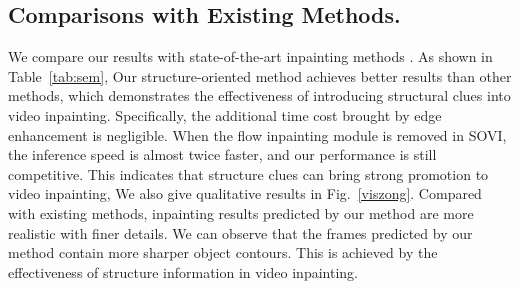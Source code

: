 \subsection{Comparisons with Existing Methods.}
We compare our results with state-of-the-art inpainting methods \cite{nazeri2019edgeconnect,wang2019video,Kim_2019_CVPR1,Xu_2019_CVPR}. 
As shown in Table~\ref{tab:sem}, Our structure-oriented method achieves better results than other methods, which demonstrates the effectiveness of introducing structural clues into video inpainting.
Specifically, the additional time cost brought by edge enhancement is negligible.
When the flow inpainting module is removed in SOVI, the inference speed is almost twice faster, and our performance is still competitive.
This indicates that structure clues can bring strong promotion to video inpainting, 
We also give qualitative results in Fig.~\ref{viszong}. Compared with existing methods, inpainting results predicted by our method are more realistic with finer details. We can observe that the frames predicted by our method contain more sharper object contours. This is achieved by the effectiveness of structure information in video inpainting.









